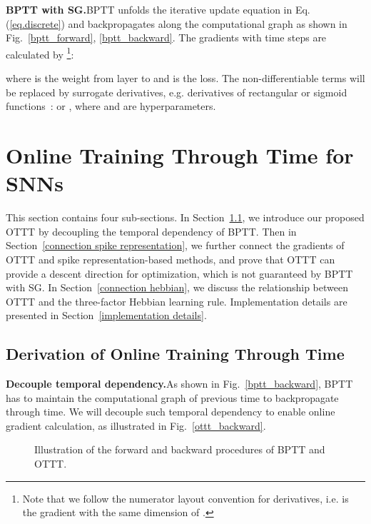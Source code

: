 \documentclass{article}
\begin{document}
\textbf{BPTT with SG.}\quad BPTT unfolds the iterative update equation in Eq.(\ref{eq.discrete}) and backpropagates along the computational graph as shown in Fig.~\ref{bptt_forward}, \ref{bptt_backward}. The gradients with  time steps are calculated by \footnote{Note that we follow the numerator layout convention for derivatives, i.e.  is the gradient with the same dimension of .\label{footnote1}}:

where  is the weight from layer  to  and  is the loss. The non-differentiable terms  will be replaced by surrogate derivatives, e.g. derivatives of  rectangular or sigmoid functions~\cite{wu2018spatio}:  or , where  and  are hyperparameters.


\section{Online Training Through Time for SNNs}\label{sec:method}
\vspace{-2mm}

This section contains four sub-sections. In Section~\ref{derivation of ottt}, we introduce our proposed OTTT by decoupling the temporal dependency of BPTT. Then in Section~\ref{connection spike representation}, we further connect the gradients of OTTT and spike representation-based methods, and prove that OTTT can provide a descent direction for optimization, which is not guaranteed by BPTT with SG. In Section~\ref{connection hebbian}, we discuss the relationship between OTTT and the three-factor Hebbian learning rule. Implementation details are presented in Section~\ref{implementation details}.

\subsection{Derivation of Online Training Through Time}\label{derivation of ottt}
\vspace{-2mm}

\textbf{Decouple temporal dependency.}\quad As shown in Fig.~\ref{bptt_backward}, BPTT has to maintain the computational graph of previous time to backpropagate through time. We will decouple such temporal dependency to enable online gradient calculation, as illustrated in Fig.~\ref{ottt_backward}. 

\begin{figure}
    \centering
    \caption{Illustration of the forward and backward procedures of BPTT and OTTT.}
    \label{fig:illustration}
\vspace{-2mm}
\end{figure}
\end{document}
